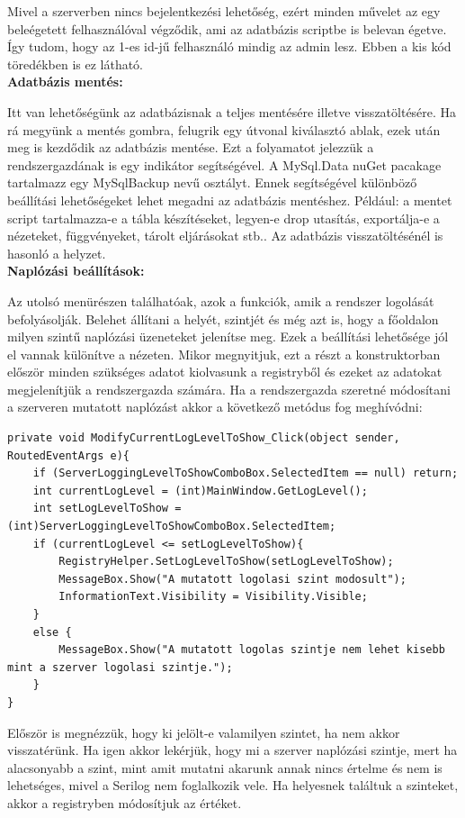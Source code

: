 \documentclass[
]{thesis-ekf}
\theoremstyle{definition}
\theoremstyle{remark}
\begin{document}
Mivel a szerverben nincs bejelentkezési lehetőség, ezért minden művelet az egy beleégetett felhasználóval végződik, ami az adatbázis scriptbe is belevan égetve. Így tudom, hogy az 1-es id-jű felhasználó mindig az admin lesz. Ebben a kis kód töredékben is ez látható.\\
\textbf{Adatbázis mentés: }

Itt van lehetőségünk az adatbázisnak a teljes mentésére illetve visszatöltésére. Ha rá megyünk a mentés gombra, felugrik egy útvonal kiválasztó ablak, ezek után meg is kezdődik az adatbázis mentése. Ezt a folyamatot jelezzük a rendszergazdának is egy indikátor segítségével. A MySql.Data nuGet pacakage tartalmazz egy MySqlBackup nevű osztályt. Ennek segítségével különböző beállítási lehetőségeket lehet megadni az adatbázis mentéshez. Például: a mentet script tartalmazza-e a tábla készítéseket, legyen-e drop utasítás, exportálja-e a nézeteket, függvényeket, tárolt eljárásokat stb.. Az adatbázis visszatöltésénél is hasonló a helyzet.\\
\textbf{Naplózási beállítások: }

Az utolsó menürészen találhatóak, azok a funkciók, amik a rendszer logolását befolyásolják. Belehet állítani a helyét, szintjét és még azt is, hogy a főoldalon milyen szintű naplózási üzeneteket jelenítse meg. Ezek a beállítási lehetősége jól el vannak különítve a nézeten. Mikor megnyitjuk, ezt a részt a konstruktorban először minden szükséges adatot kiolvasunk a registryből és ezeket az adatokat megjelenítjük a rendszergazda számára. Ha a rendszergazda szeretné módosítani a szerveren mutatott naplózást akkor a következő metódus fog meghívódni:
\begin{lstlisting}
private void ModifyCurrentLogLevelToShow_Click(object sender, RoutedEventArgs e){
	if (ServerLoggingLevelToShowComboBox.SelectedItem == null) return;
	int currentLogLevel = (int)MainWindow.GetLogLevel();
	int setLogLevelToShow = (int)ServerLoggingLevelToShowComboBox.SelectedItem;
	if (currentLogLevel <= setLogLevelToShow){
		RegistryHelper.SetLogLevelToShow(setLogLevelToShow);
		MessageBox.Show("A mutatott logolasi szint modosult");
		InformationText.Visibility = Visibility.Visible;
	}
	else {
		MessageBox.Show("A mutatott logolas szintje nem lehet kisebb mint a szerver logolasi szintje.");
	}
}
\end{lstlisting}
Először is megnézzük, hogy ki jelölt-e valamilyen szintet, ha nem akkor visszatérünk. Ha igen akkor lekérjük, hogy mi a szerver naplózási szintje, mert ha alacsonyabb a szint, mint amit mutatni akarunk annak nincs értelme és nem is lehetséges, mivel a Serilog nem foglalkozik vele. Ha helyesnek találtuk a szinteket, akkor a registryben módosítjuk az értéket. 
\end{document}
